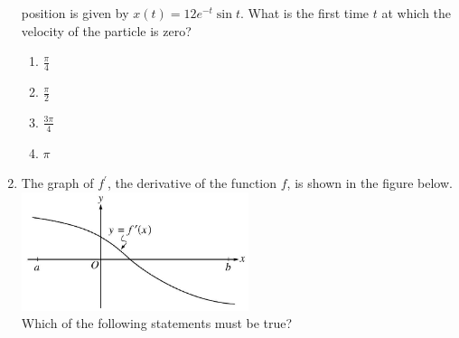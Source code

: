 \documentclass{article}
\begin{document}
\begin{enumerate}
\begin{minipage}[t]{\linewidth}
position is given by \(x(t)=12 e^{-t} \sin t\). What is the first time
\(t\) at which the velocity of the particle is zero?
\vspace{1em}
		\begin{enumerate}
		\itemsep1em
			\item \(\frac{\pi}{4}\)
			\item \(\frac{\pi}{2}\)
			\item \(\frac{3 \pi}{4}\)
			\item \(\pi\)
		\end{enumerate}
	\end{minipage}
	\item
	\begin{minipage}[t]{\linewidth}
		The graph of \(f^{\prime}\), the derivative of the function \(f\), is
shown in the figure below.\\
\includegraphics[width=2.62in]{media/3d1baae0-8207-59f4-922b-d9e10c1f8433.jpg}\\
Which of the following statements must be true?


\end{minipage}
\end{enumerate}
\end{document}
